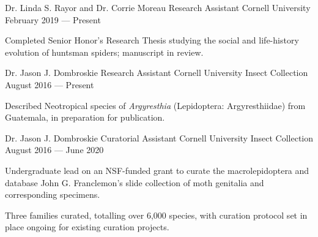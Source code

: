 

\begin{cventries}

  \cventry
    {Dr. Linda S. Rayor and Dr. Corrie Moreau} %
    {Research Assistant} %
    {Cornell University} %
    {February 2019 — Present} %
    {
      \begin{cvitems} %
        \item {Completed Senior Honor's Research Thesis studying the social and life-history evolution of huntsman spiders; manuscript in review.}
      \end{cvitems}
    }

  \cventry
    {Dr. Jason J. Dombroskie} %
    {Research Assistant} %
    {Cornell University Insect Collection} %
    {August 2016 — Present} %
    {
      \begin{cvitems} %
        \item {Described Neotropical species of \textit{Argyresthia} (Lepidoptera: Argyresthiidae) from Guatemala, in preparation for publication.}
      \end{cvitems}
    }

  \cventry
    {Dr. Jason J. Dombroskie} %
    {Curatorial Assistant} %
    {Cornell University Insect Collection} %
    {August 2016 — June 2020} %
    {
      \begin{cvitems} %
        \item {Undergraduate lead on an NSF-funded grant to curate the macrolepidoptera and database John G. Franclemon's slide collection of moth genitalia and corresponding specimens.}
        \item {Three families curated, totalling over 6,000 species, with curation protocol set in place ongoing for existing curation projects.}
      \end{cvitems}
    }


\end{cventries}
